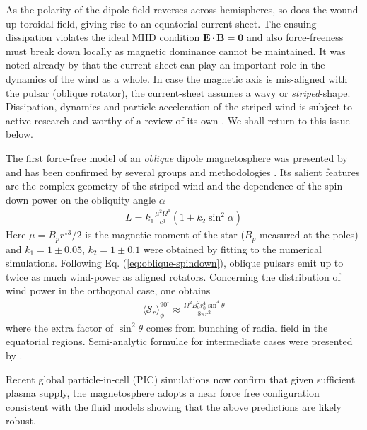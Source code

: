 As the polarity of the dipole field reverses across hemispheres, so does the wound-up toroidal field, giving rise to an equatorial current-sheet.  The ensuing dissipation violates the ideal MHD condition $\mathbf{E\cdot B=0}$ and also force-freeness must break down locally as magnetic dominance cannot be maintained.  
It was noted already by \cite{coroniti1990} that the current sheet can play an important role in the dynamics of the wind as a whole.  In case the magnetic axis is mis-aligned with the pulsar (oblique rotator), the current-sheet assumes a wavy or \emph{striped}-shape.  Dissipation, dynamics and particle acceleration of the striped wind is subject to active research and worthy of a review of its own \citep[see ][]{arons2012}.  We shall return to this issue below.  

The first force-free model of an \emph{oblique} dipole magnetosphere was presented by \cite{spitkovsky2006} and has been confirmed by several groups and methodologies \citep{kalapotharakos2012,2016MNRAS.455.3779P,2016MNRAS.457.3384T}.  Its salient features are the complex geometry of the  striped wind \citep[as predicted by][]{Michel1971} and the dependence of the spin-down power on the obliquity angle $\alpha$
\begin{align}
L = k_1 \frac{\mu^2 \Omega^4}{c^3}(1+k_2\sin^2 \alpha) \label{eq:oblique-spindown}
\end{align}
Here $\mu=B_p r^{\star3}/2$ is the magnetic moment of the star ($B_p$ measured at the poles) and $k_1=1 \pm 0.05$, $k_2 =1\pm 0.1$ were obtained by fitting to the numerical simulations.  Following Eq. (\ref{eq:oblique-spindown}), oblique pulsars emit up to twice as much wind-power as aligned rotators.  Concerning the distribution of wind power in the orthogonal case, one obtains 
\begin{align}
\langle \mathcal{S}_r\rangle_\phi^{90^\circ} \approx \frac{\Omega^2 B_0^2 r_0^4 \sin^4\theta}{8\pi r^2} \label{eq:obliquesr}
\end{align}
where the extra factor of $\sin^2\theta$ comes from bunching of radial field in the equatorial regions.  Semi-analytic formulae for intermediate cases were presented by \cite{2016MNRAS.457.3384T}.  

Recent global particle-in-cell (PIC) simulations now confirm that given sufficient plasma supply, the magnetosphere adopts a near force free configuration consistent with the fluid models \citep{PhilippovSpitkovsky2014,ChenBeloborodov2014,Belyaev2015,CeruttiPhilippov2015} showing that the above predictions are likely robust.  

